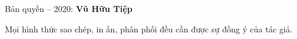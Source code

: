\thispagestyle{empty}

\vspace{1cm} 

\vspace{1cm}
Bản quyền  -- 2020: \textbf{Vũ Hữu Tiệp}

Mọi hình thức sao chép, in ấn, phân phối đều cần được sự đồng ý của tác giả.
